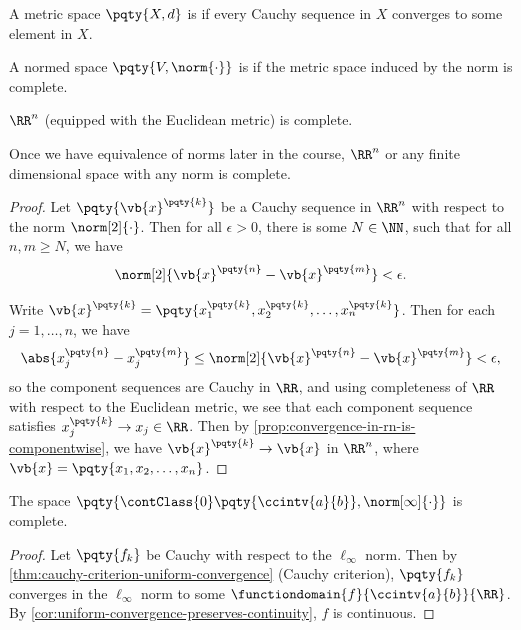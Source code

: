 \begin{definition}
    A metric space \(\pqty{X, d}\) is  if every Cauchy sequence in \(X\) converges to some element in \(X\).

    A normed space \(\pqty{V, \norm{\cdot}}\) is  if the metric space induced by the norm is complete.
\end{definition}

\begin{theorem}[Completeness of \(\RR^n\)]
    \label{thm:completeness-of-rn}%
    \(\RR^n\) (equipped with the Euclidean metric) is complete.
\end{theorem}

\begin{remark}
    Once we have equivalence of norms later in the course, \(\RR^n\) or any finite dimensional space with any norm is complete.
\end{remark}

\begin{proof}
    Let \(\pqty{\vb{x}^{\pqty{k}}}\) be a Cauchy sequence in \(\RR^n\) with respect to the norm \(\norm[2]{\cdot}\). Then for all \(\epsilon > 0\), there is some \(N \in \NN\), such that for all \(n, m \geq N\), we have
    \[
        \norm[2]{\vb{x}^{\pqty{n}} - \vb{x}^{\pqty{m}}} < \epsilon.
    \]

    Write \(\vb{x}^{\pqty{k}} = \pqty{x_1^{\pqty{k}}, x_2^{\pqty{k}}, \ldots, x_n^{\pqty{k}}}\). Then for each \(j = 1, \ldots, n\), we have
    \[
        \abs{x_j^{\pqty{n}} - x_j^{\pqty{m}}} \leq \norm[2]{\vb{x}^{\pqty{n}} - \vb{x}^{\pqty{m}}} < \epsilon,
    \]
    so the component sequences are Cauchy in \(\RR\), and using completeness of \(\RR\) with respect to the Euclidean metric, we see that each component sequence satisfies \(x_j^{\pqty{k}} \to x_j \in \RR\). Then by \autoref{prop:convergence-in-rn-is-componentwise}, we have \(\vb{x}^{\pqty{k}} \to \vb{x}\) in \(\RR^n\), where \(\vb{x} = \pqty{x_1, x_2, \ldots, x_n}\).
\end{proof}

\begin{theorem}
    \label{thm:completeness-of-contclass-0}%
    The space \(\pqty{\contClass{0}\pqty{\ccintv{a}{b}}, \norm[\infty]{\cdot}}\) is complete.
\end{theorem}

\begin{proof}
    Let \(\pqty{f_k}\) be Cauchy with respect to the \(\ell_{\infty}\) norm. Then by \autoref{thm:cauchy-criterion-uniform-convergence} (Cauchy criterion), \(\pqty{f_k}\) converges in the \(\ell_{\infty}\) norm to some \(\functiondomain{f}{\ccintv{a}{b}}{\RR}\). By \autoref{cor:uniform-convergence-preserves-continuity}, \(f\) is continuous. 
\end{proof}

